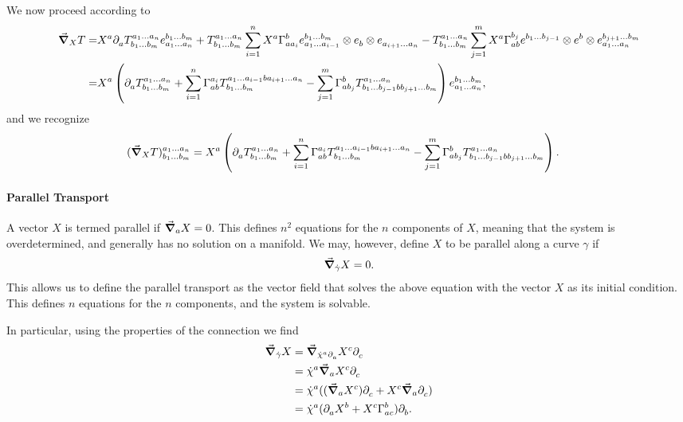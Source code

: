 We now proceed according to
\begin{align*}
	\dcov{X}{T} =& X^{a}\del{}{a}{\tensor*{T}{^{a_{1}\dots a_{n}}_{b_{1}\dots b_{m}}}}\tensor*{e}{^{b_{1}\dots b_{m}}_{a_{1}\dots a_{n}}} + \tensor*{T}{^{a_{1}\dots a_{n}}_{b_{1}\dots b_{m}}}\sum\limits_{i = 1}^{n}X^{a}\chris{b}{a}{a_{i}}\tensor*{e}{^{b_{1}\dots b_{m}}_{a_{1}\dots a_{i - 1}}}\otimes\tensor*{e}{_{b}}\otimes\tensor*{e}{_{a_{i + 1}\dots a_{n}}} - \tensor*{T}{^{a_{1}\dots a_{n}}_{b_{1}\dots b_{m}}}\sum\limits_{j = 1}^{m}X^{a}\chris{b_{j}}{a}{b}\tensor*{e}{^{b_{1}\dots b_{j - 1}}}\otimes\tensor*{e}{^{b}}\otimes\tensor*{e}{^{b_{j + 1}\dots b_{m}}_{a_{1}\dots a_{n}}} \\
	            =& X^{a}\left(\del{}{a}{\tensor*{T}{^{a_{1}\dots a_{n}}_{b_{1}\dots b_{m}}}} + \sum\limits_{i = 1}^{n}\chris{a_{i}}{a}{b}\tensor*{T}{^{a_{1}\dots a_{i - 1}ba_{i + 1}\dots a_{n}}_{b_{1}\dots b_{m}}} - \sum\limits_{j = 1}^{m}\chris{b}{a}{b_{j}}\tensor*{T}{^{a_{1}\dots a_{n}}_{b_{1}\dots b_{j - 1}bb_{j + 1}\dots b_{m}}}\right)\tensor*{e}{^{b_{1}\dots b_{m}}_{a_{1}\dots a_{n}}},
\end{align*}
and we recognize
\begin{align*}
	\tensor*{(\dcov{X}{T})}{^{a_{1}\dots a_{n}}_{b_{1}\dots b_{m}}} &= X^{a}\left(\del{}{a}{\tensor*{T}{^{a_{1}\dots a_{n}}_{b_{1}\dots b_{m}}}} + \sum\limits_{i = 1}^{n}\chris{a_{i}}{a}{b}\tensor*{T}{^{a_{1}\dots a_{i - 1}ba_{i + 1}\dots a_{n}}_{b_{1}\dots b_{m}}} - \sum\limits_{j = 1}^{m}\chris{b}{a}{b_{j}}\tensor*{T}{^{a_{1}\dots a_{n}}_{b_{1}\dots b_{j - 1}bb_{j + 1}\dots b_{m}}}\right).
\end{align*}

\paragraph{Parallel Transport}
A vector $X$ is termed parallel if $\grad_{a}{X} = 0$. This defines $n^{2}$ equations for the $n$ components of $X$, meaning that the system is overdetermined, and generally has no solution on a manifold. We may, however, define $X$ to be parallel along a curve $\gamma$ if
\begin{align*}
	\grad_{\dot{\gamma}}{X} = 0.
\end{align*}
This allows us to define the parallel transport as the vector field that solves the above equation with the vector $X$ as its initial condition. This defines $n$ equations for the $n$ components, and the system is solvable.

In particular, using the properties of the connection we find
\begin{align*}
	\dcov{\dot{\gamma}}{X} &= \dcov{\dot{\chi}^{a}\del{}{a}{}}{X^{c}\del{}{c}{}} \\
	                       &= \dot{\chi}^{a}\dcov{a}{X^{c}\del{}{c}{}} \\
	                       &= \dot{\chi}^{a}((\dcov{a}{X^{c}})\del{}{c}{} + X^{c}\dcov{a}{\del{}{c}{}}) \\
	                       &= \dot{\chi}^{a}(\del{}{a}{X^{b}} + X^{c}\chris{b}{a}{c})\del{}{b}{}.
\end{align*}

